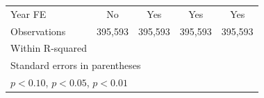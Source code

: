 \begin{table}[htbp]
\begin{tabular}{l*{4}{c}}
Year FE             &          No         &         Yes         &         Yes         &         Yes         \\
Observations        &     395,593         &     395,593         &     395,593         &     395,593         \\
Within R-squared    &                     &                     &                     &                     \\
\bottomrule
\multicolumn{5}{l}{\footnotesize Standard errors in parentheses}\\
\multicolumn{5}{l}{\footnotesize \sym{*} \(p<0.10\), \sym{**} \(p<0.05\), \sym{***} \(p<0.01\)}\\
\end{tabular}
\end{table}
